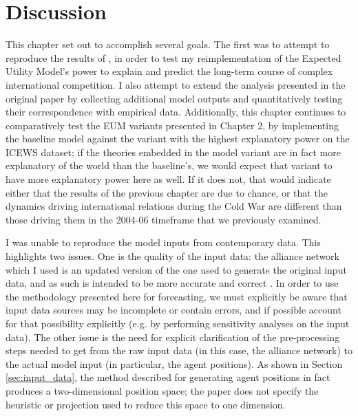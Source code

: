 \section{Discussion} \label{cw_discussion}




This chapter set out to accomplish several goals. The first was to attempt to reproduce the results of \citet{bdm_1998}, in order to test my reimplementation of the Expected Utility Model's power to explain and predict the long-term course of complex international competition. I also attempt to extend the analysis presented in the original paper by collecting additional model outputs and quantitatively testing their correspondence with empirical data. Additionally, this chapter continues to comparatively test the EUM variants presented in Chapter 2, by implementing the baseline model against the variant with the highest explanatory power on the ICEWS dataset; if the theories embedded in the model variant are in fact more explanatory of the world than the baseline's, we would expect that variant to have more explanatory power here as well. If it does not, that would indicate either that the results of the previous chapter are due to chance, or that the dynamics driving international relations during the Cold War are different than those driving them in the 2004-06 timeframe that we previously examined.

I was unable to reproduce the model inputs from contemporary data. This highlights two issues. One is the quality of the input data: the alliance network which I used is an updated version of the one used to generate the original input data, and as such is intended to be more accurate and correct \citep{gibler_2013}. In order to use the methodology presented here for forecasting, we must explicitly be aware that input data sources may be incomplete or contain errors, and if possible account for that possibility explicitly (e.g. by performing sensitivity analyses on the input data). The other issue is the need for explicit clarification of the pre-processing steps needed to get from the raw input data (in this case, the alliance network) to the actual model input (in particular, the agent positions). As shown in Section \ref{sec:input_data}, the method described for generating agent positions in fact produces a two-dimensional position space; the paper does not specify the heuristic or projection used to reduce this space to one dimension.


